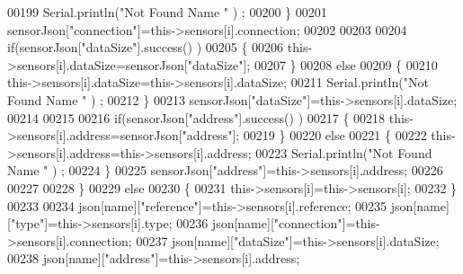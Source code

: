 \begin{DoxyCode}
00199                             Serial.println(\textcolor{stringliteral}{"Not Found Name "} ) ;                        
00200                         \}
00201                         sensorJson[\textcolor{stringliteral}{"connection"}]=this->sensors[i].connection;
00202 
00203                     
00204                         \textcolor{keywordflow}{if}(sensorJson[\textcolor{stringliteral}{"dataSize"}].success() )
00205                         \{               
00206                             this->sensors[i].dataSize=sensorJson[\textcolor{stringliteral}{"dataSize"}];
00207                         \}
00208                         \textcolor{keywordflow}{else}
00209                         \{
00210                             this->sensors[i].dataSize=this->sensors[i].dataSize;
00211                             Serial.println(\textcolor{stringliteral}{"Not Found Name "} ) ;                        
00212                         \}
00213                         sensorJson[\textcolor{stringliteral}{"dataSize"}]=this->sensors[i].dataSize;
00214 
00215                     
00216                         \textcolor{keywordflow}{if}(sensorJson[\textcolor{stringliteral}{"address"}].success() )
00217                         \{                   
00218                             this->sensors[i].address=sensorJson[\textcolor{stringliteral}{"address"}];
00219                         \}
00220                         \textcolor{keywordflow}{else}
00221                         \{   
00222                             this->sensors[i].address=this->sensors[i].address;
00223                             Serial.println(\textcolor{stringliteral}{"Not Found Name "} ) ;                        
00224                         \}
00225                         sensorJson[\textcolor{stringliteral}{"address"}]=this->sensors[i].address;
00226                     
00227     
00228                     \}
00229                     \textcolor{keywordflow}{else}
00230                     \{
00231                         this->sensors[i]=this->sensors[i];                  
00232                     \}
00233                                             
00234                     json[name][\textcolor{stringliteral}{"reference"}]=this->sensors[i].reference;
00235                     json[name][\textcolor{stringliteral}{"type"}]=this->sensors[i].type;
00236                     json[name][\textcolor{stringliteral}{"connection"}]=this->sensors[i].connection;
00237                     json[name][\textcolor{stringliteral}{"dataSize"}]=this->sensors[i].dataSize;
00238                     json[name][\textcolor{stringliteral}{"address"}]=this->sensors[i].address;

\end{DoxyCode}
